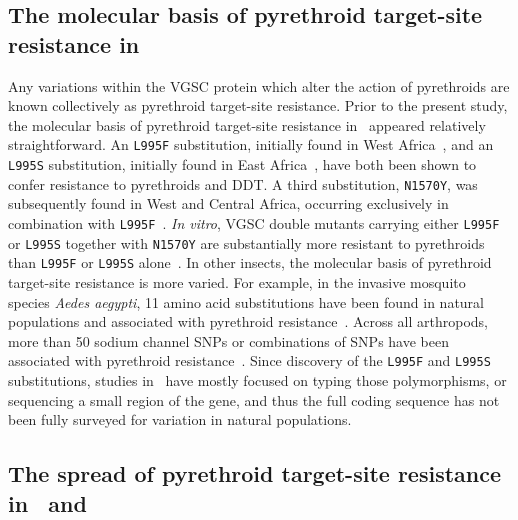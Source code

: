 \documentclass[a4paper,11pt,abstracton,hidelinks]{scrartcl}
\begin{document}
\subsection{The molecular basis of pyrethroid target-site resistance in \agam}\label{subsec:intro-mol}


Any variations within the VGSC protein which alter the action of pyrethroids are known collectively as pyrethroid target-site resistance.
%
Prior to the present study, the molecular basis of pyrethroid target-site resistance in \agam\ appeared relatively straightforward.
%
An \texttt{L995F} substitution, initially found in West Africa~\parencite{MartinezTorres1998}, and an \texttt{L995S} substitution, initially found in East Africa~\parencite{Ranson2000a}, have both been shown to confer resistance to pyrethroids and DDT\footnotemark.
%
%
A third substitution, \texttt{N1570Y}, was subsequently found in West and Central Africa, occurring exclusively in combination with \texttt{L995F}~\parencite{Jones2012}.
%
\textit{In vitro}, VGSC double mutants carrying either \texttt{L995F} or \texttt{L995S} together with \texttt{N1570Y} are substantially more resistant to pyrethroids than \texttt{L995F} or \texttt{L995S} alone~\parencite{Wang2015}.
%
In other insects, the molecular basis of pyrethroid target-site resistance is more varied.
%
For example, in the invasive mosquito species \textit{Aedes aegypti}, 11 amino acid substitutions have been found in natural populations and associated with pyrethroid resistance~\parencite{Du2016,Haddi2017}.
%
Across all arthropods, more than 50 sodium channel SNPs or combinations of SNPs have been associated with pyrethroid resistance~\parencite{Dong2014}.
%
Since discovery of the \texttt{L995F} and \texttt{L995S} substitutions, studies in \agam\ have mostly focused on typing those polymorphisms, or sequencing a small region of the gene, and thus the full coding sequence has not been fully surveyed for variation in natural populations.


\subsection{The spread of pyrethroid target-site resistance in \agam\ and \acol}\label{subsec:intro-spread}
\end{document}
